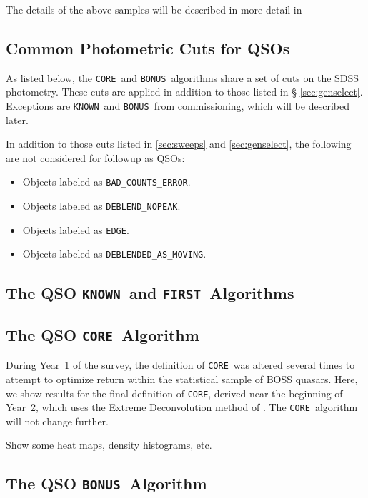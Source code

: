 \documentclass[12pt,preprint]{aastex}
\newcommand{\core}{\texttt{CORE}}
\newcommand{\bonus}{\texttt{BONUS}}
\newcommand{\known}{\texttt{KNOWN}}
\newcommand{\first}{\texttt{FIRST}}
\begin{document}
The details of the above samples will be described in more detail in


\subsection{Common Photometric Cuts for QSOs}

As listed below, the \core\ and \bonus\ algorithms share a set of cuts on the
SDSS photometry. These cuts are applied in addition to those listed in \S
\ref{sec:genselect}. Exceptions are \known\ and \bonus\ from commissioning,
which will be described later.

In addition to those cuts listed in \ref{sec:sweeps} and \ref{sec:genselect},
the following are not considered for followup as QSOs:

\begin{itemize}

    \item Objects labeled as \texttt{BAD\_COUNTS\_ERROR}.
    \item Objects labeled as \texttt{DEBLEND\_NOPEAK}.
    \item Objects labeled as \texttt{EDGE}.
    \item Objects labeled as \texttt{DEBLENDED\_AS\_MOVING}.

\end{itemize}

\subsection{The QSO \known\ and \first\ Algorithms} \label{sec:knownfirst}

\subsection{The QSO \core\ Algorithm}

During Year~1 of the survey, the definition of \core\ was altered several times
to attempt to optimize return within the statistical sample of BOSS quasars.
Here, we show results for the final definition of \core, derived near the
beginning of Year~2, which uses the Extreme Deconvolution method of
\citet{BovyQSOPhotoz2011}.  The \core\ algorithm will not change further.

Show some heat maps, density histograms, etc.

\subsection{The QSO \bonus\ Algorithm}
\end{document}
